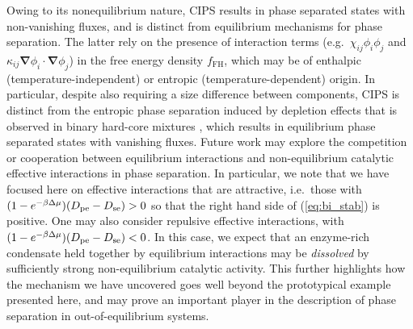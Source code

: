 Owing to its nonequilibrium nature, CIPS results in phase separated states with non-vanishing fluxes, and is distinct from equilibrium mechanisms for phase separation. The latter rely on the presence of interaction terms (e.g.~$\chi_{ij}\phi_i\phi_j$ and $\kappa_{ij}\bm{\nabla} \phi_i \cdot \bm{\nabla} \phi_j$) in the free energy density $f_\mathrm{FH}$, which may be of enthalpic (temperature-independent) or entropic (temperature-dependent) origin. In particular, despite also requiring a size difference between components, CIPS is distinct from the entropic phase separation induced by depletion effects that is observed in binary hard-core mixtures \cite{frenkel1992phase}, which results in equilibrium phase separated states with vanishing fluxes.
Future work may explore the competition or cooperation between equilibrium interactions and non-equilibrium catalytic effective interactions in phase separation.
In particular, we note that we have focused here on effective interactions that are attractive, i.e.~those with $(1-e^{-\beta \Delta \mu})(D_{\mathrm{pe}}-D_{\mathrm{se}})>0$ so that the right hand side of (\ref{eq:bi_stab}) is positive. One may also consider repulsive effective interactions, with $(1-e^{-\beta \Delta \mu})(D_{\mathrm{pe}}-D_{\mathrm{se}})<0$. In this case, we expect that an enzyme-rich condensate held together by equilibrium interactions may be {\it dissolved} by sufficiently strong non-equilibrium catalytic activity. This further highlights how the mechanism we have uncovered goes well beyond the prototypical example presented here, and may prove an important player in the description of phase separation in out-of-equilibrium systems.
